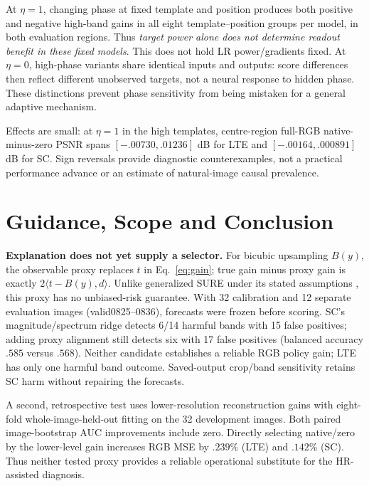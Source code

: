 At $\eta=1$, changing phase at fixed template and position produces both
positive and negative high-band gains in all eight template--position
groups per model, in both evaluation regions. Thus \emph{target power
alone does not determine readout benefit in these fixed models}.
This does not hold LR power/gradients fixed. At $\eta=0$, high-phase
variants share identical inputs and outputs: score differences then
reflect different unobserved targets, not a neural response to hidden
phase. These distinctions prevent phase sensitivity from being mistaken
for a general adaptive mechanism.

Effects are small: at $\eta=1$ in the high templates, centre-region
full-RGB native-minus-zero PSNR spans $[-.00730,.01236]$ dB for LTE and
$[-.00164,.000891]$ dB for SC. Sign reversals provide diagnostic
counterexamples, not a practical performance advance or an estimate
of natural-image causal prevalence.

\section{Guidance, Scope and Conclusion}
\label{sec:limits}
\textbf{Explanation does not yet supply a selector.}
For bicubic upsampling $B(y)$, the observable proxy replaces $t$ in
Eq.~\eqref{eq:gain}; true gain minus proxy gain is exactly
$2\langle t-B(y),d\rangle$. Unlike generalized SURE under its stated
assumptions \cite{eldar2008gsure}, this proxy has no unbiased-risk guarantee.
With 32 calibration and 12 separate evaluation images (valid0825--0836),
forecasts were frozen before scoring. SC's magnitude/spectrum ridge
detects 6/14 harmful bands with 15 false positives; adding proxy alignment
still detects six with 17 false positives (balanced accuracy $.585$
versus $.568$). Neither candidate establishes a reliable RGB policy gain;
LTE has only one harmful band outcome. Saved-output crop/band sensitivity
retains SC harm without repairing the forecasts.

A second, retrospective test uses lower-resolution reconstruction gains
with eight-fold whole-image-held-out fitting on the 32 development images.
Both paired image-bootstrap AUC improvements include zero. Directly
selecting native/zero by the lower-level gain increases RGB MSE by
$.239\%$ (LTE) and $.142\%$ (SC). Thus neither tested proxy provides a
reliable operational substitute for the HR-assisted diagnosis. 

